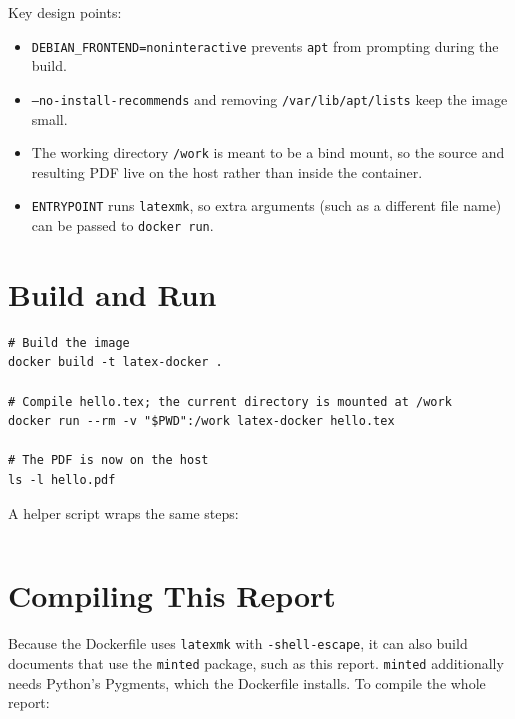 \begin{listing}[H]
\inputminted[fontsize=\small,breaklines,frame=lines,linenos]{docker}{latex-docker/Dockerfile}
\caption{\texttt{Dockerfile} for the TeX Live compile container.}
\end{listing}

Key design points:
\begin{itemize}
  \item \texttt{DEBIAN\_FRONTEND=noninteractive} prevents \texttt{apt} from
        prompting during the build.
  \item \texttt{--no-install-recommends} and removing \texttt{/var/lib/apt/lists}
        keep the image small.
  \item The working directory \texttt{/work} is meant to be a bind mount, so the
        source and resulting PDF live on the host rather than inside the container.
  \item \texttt{ENTRYPOINT} runs \texttt{latexmk}, so extra arguments (such as a
        different file name) can be passed to \texttt{docker run}.
\end{itemize}

\section{Build and Run}
\begin{listing}[H]
\begin{verbatim}
# Build the image
docker build -t latex-docker .

# Compile hello.tex; the current directory is mounted at /work
docker run --rm -v "$PWD":/work latex-docker hello.tex

# The PDF is now on the host
ls -l hello.pdf
\end{verbatim}
\caption{Building the image and compiling the document.}
\end{listing}

A helper script wraps the same steps:

\begin{listing}[H]
\inputminted[fontsize=\small,breaklines,frame=lines]{bash}{latex-docker/compile.sh}
\caption{\texttt{compile.sh}: build-and-compile helper.}
\end{listing}

\section{Compiling This Report}
Because the Dockerfile uses \texttt{latexmk} with \texttt{-shell-escape}, it can
also build documents that use the \texttt{minted} package, such as this report.
\texttt{minted} additionally needs Python's Pygments, which the Dockerfile
installs. To compile the whole report:

